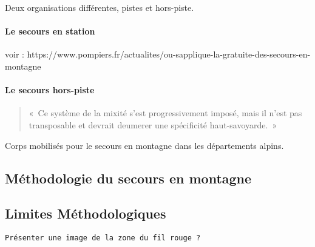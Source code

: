 Deux organisations différentes, pistes et hors-piste.

\paragraph{Le secours en station}

voir : https://www.pompiers.fr/actualites/ou-sapplique-la-gratuite-des-secours-en-montagne

\paragraph{Le secours hors-piste}



\begin{quotation}
  «~Ce système de la mixité s'est progressivement imposé, mais il
  n'est pas transposable et devrait deumerer une spécificité
  haut-savoyarde.~»
\end{quotation}

\begin{table}
  \centering
  
  \caption{Corps mobilisés pour le secours en montagne dans les
    départements alpins.}
  \label{tab:organisation_secours_departements}
\end{table}


\subsection{Méthodologie du secours en montagne}
\label{susec:1-1-2}

\subsection{Limites Méthodologiques}
\label{subsec:1-1-3}

\texttt{Présenter une image de la zone du fil rouge ?}
